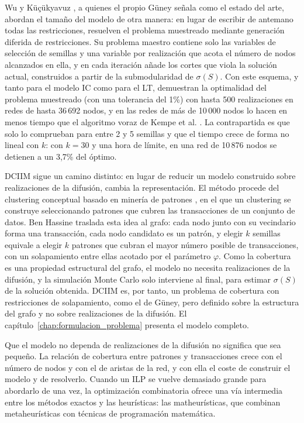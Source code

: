 \documentclass[12pt,twoside,titlepage]{report}
\begin{document}
Wu y Küçükyavuz \cite{wu2018two}, a quienes el propio Güney señala como el estado del arte, abordan el tamaño del modelo de otra manera: en lugar de escribir de antemano todas las restricciones, resuelven el problema muestreado mediante generación diferida de restricciones.
Su problema maestro contiene solo las variables de selección de semillas y una variable por realización que acota el número de nodos alcanzados en ella, y en cada iteración añade los cortes que viola la solución actual, construidos a partir de la submodularidad de $\sigma(S)$.
Con este esquema, y tanto para el modelo IC como para el LT, demuestran la optimalidad del problema muestreado (con una tolerancia del 1\%) con hasta 500 realizaciones en redes de hasta 36\,692 nodos, y en las redes de más de 10\,000 nodos lo hacen en menos tiempo que el algoritmo voraz de Kempe et al. \cite{kempe2003maximizing}.
La contrapartida es que solo lo comprueban para entre 2 y 5 semillas y que el tiempo crece de forma no lineal con $k$: con $k = 30$ y una hora de límite, en una red de 10\,876 nodos se detienen a un 3,7\% del óptimo.

DCIIM \cite{motaz} sigue un camino distinto: en lugar de reducir un modelo construido sobre realizaciones de la difusión, cambia la representación.
El método procede del clustering conceptual basado en minería de patrones \cite{hassine2024conceptual}, en el que un clustering se construye seleccionando patrones que cubren las transacciones de un conjunto de datos.
Ben Hassine traslada esta idea al grafo: cada nodo junto con su vecindario forma una transacción, cada nodo candidato es un patrón, y elegir $k$ semillas equivale a elegir $k$ patrones que cubran el mayor número posible de transacciones, con un solapamiento entre ellas acotado por el parámetro $\varphi$.
Como la cobertura es una propiedad estructural del grafo, el modelo no necesita realizaciones de la difusión, y la simulación Monte Carlo solo interviene al final, para estimar $\sigma(S)$ de la solución obtenida.
DCIIM es, por tanto, un problema de cobertura con restricciones de solapamiento, como el de Güney, pero definido sobre la estructura del grafo y no sobre realizaciones de la difusión.
El capítulo~\ref{chap:formulacion_problema} presenta el modelo completo.

Que el modelo no dependa de realizaciones de la difusión no significa que sea pequeño.
La relación de cobertura entre patrones y transacciones crece con el número de nodos y con el de aristas de la red, y con ella el coste de construir el modelo y de resolverlo.
Cuando un ILP se vuelve demasiado grande para abordarlo de una vez, la optimización combinatoria ofrece una vía intermedia entre los métodos exactos y las heurísticas: las matheurísticas, que combinan metaheurísticas con técnicas de programación matemática.
\end{document}
